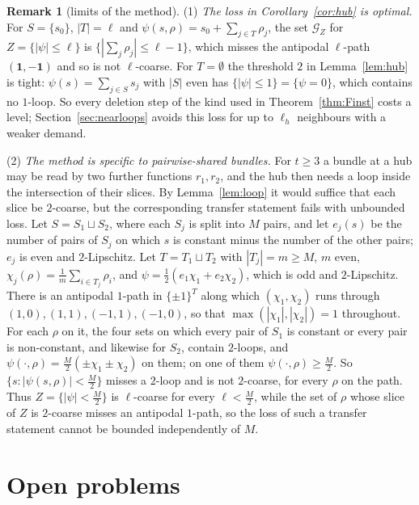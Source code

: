 \documentclass[11pt,letterpaper]{article}
\theoremstyle{definition}
\newtheorem{remark}[theorem]{Remark}
\newcommand{\cG}{\mathcal{G}}
\newcommand{\cube}[1]{\{\pm1\}^{#1}}
\begin{document}
\begin{remark}[limits of the method]\label{rem:hublimits}
(1) \emph{The loss in Corollary~\ref{cor:hub} is optimal.} For $S=\{s_0\}$, $|T|=\ell$ and
$\psi(s,\rho)=s_0+\sum_{j\in T}\rho_j$, the set $\cG_Z$ for $Z=\{|\psi|\le\ell\}$ is
$\{|\sum_j\rho_j|\le\ell-1\}$, which misses the antipodal $\ell$-path $(\mathbf 1,-\mathbf 1)$ and
so is not $\ell$-coarse. For $T=\emptyset$ the threshold $2$ in Lemma~\ref{lem:hub} is tight:
$\psi(s)=\sum_{j\in S}s_j$ with $|S|$ even has $\{|\psi|\le1\}=\{\psi=0\}$, which contains no
$1$-loop. So every deletion step of the kind used in Theorem~\ref{thm:Finst} costs a level;
Section~\ref{sec:nearloops} avoids this loss for up to $\ell_h$ neighbours with a weaker demand.

(2) \emph{The method is specific to pairwise-shared bundles.} For $t\ge3$ a bundle at a hub may be read by two
further functions $r_1,r_2$, and the hub then needs a loop inside the intersection of their
slices. By Lemma~\ref{lem:loop} it would suffice that each slice be $2$-coarse, but the
corresponding transfer statement fails with unbounded loss. Let $S=S_1\sqcup S_2$, where each $S_j$
is split into $M$ pairs, and let $e_j(s)$ be the number of pairs of $S_j$ on which $s$ is constant
minus the number of the other pairs; $e_j$ is even and $2$-Lipschitz. Let $T=T_1\sqcup T_2$ with
$|T_j|=m\ge M$, $m$ even, $\chi_j(\rho)=\frac1m\sum_{i\in T_j}\rho_i$, and
$\psi=\frac12(e_1\chi_1+e_2\chi_2)$, which is odd and $2$-Lipschitz. There is an antipodal $1$-path
in $\cube T$ along which $(\chi_1,\chi_2)$ runs through $(1,0),(1,1),(-1,1),(-1,0)$, so that
$\max(|\chi_1|,|\chi_2|)=1$ throughout. For each $\rho$ on it, the four sets on which every pair of
$S_1$ is constant or every pair is non-constant, and likewise for $S_2$, contain $2$-loops, and
$\psi(\cdot,\rho)=\frac M2(\pm\chi_1\pm\chi_2)$ on them; on one of them $\psi(\cdot,\rho)\ge\frac M2$.
So $\{s:|\psi(s,\rho)|<\frac M2\}$ misses a $2$-loop and is not $2$-coarse, for every $\rho$ on the
path. Thus $Z=\{|\psi|<\frac M2\}$ is $\ell$-coarse for every $\ell<\frac M2$, while the set of
$\rho$ whose slice of $Z$ is $2$-coarse misses an antipodal $1$-path, so the loss of such a
transfer statement cannot be bounded independently of $M$.
\end{remark}

\section{Open problems}\label{sec:open}
\end{document}
